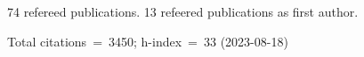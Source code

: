 74 refereed publications. 13 refeered publications as first author.

Total citations~=~3450; h-index~=~33 (2023-08-18)